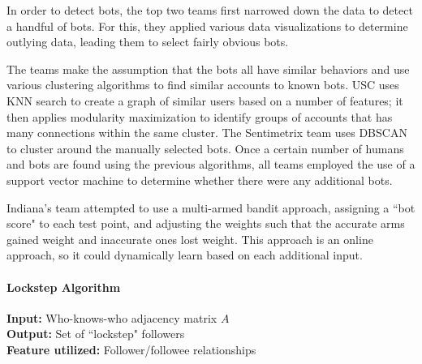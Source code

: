 \documentclass[11pt, oneside]{article}   	%
\begin{document}
\quad In order to detect bots, the top two teams first narrowed down the data to detect a handful of bots.
For this, they applied various data visualizations to determine outlying data, leading them to select fairly obvious bots.

\quad The teams make the assumption that the bots all have similar behaviors and use various clustering algorithms to find similar accounts to known bots.
USC uses KNN search to create a graph of similar users based on a number of features; it then applies modularity maximization to identify groups of accounts that has many connections within the same cluster.
The Sentimetrix team uses DBSCAN to cluster around the manually selected bots.
Once a certain number of humans and bots are found using the previous algorithms, all teams employed the use of a support vector machine to determine whether there were any additional bots.

\quad Indiana's team attempted to use a multi-armed bandit approach, assigning a ``bot score" to each test point, and adjusting the weights such that the accurate arms gained weight and inaccurate ones lost weight.
This approach is an online approach, so it could dynamically learn based on each additional input.

\paragraph{Lockstep Algorithm}
\quad

\textbf{Input:} Who-knows-who adjacency matrix $A$\\
\textbf{Output:} Set of ``lockstep" followers\\
\textbf{Feature utilized:} Follower/followee relationships
\end{document}
